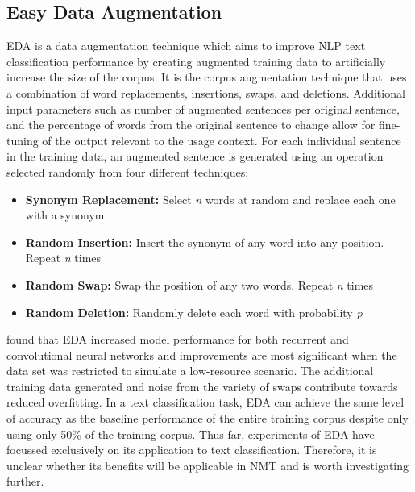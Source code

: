 





\subsection{Easy Data Augmentation}
\acrfull{EDA} is a data augmentation technique which aims to improve \acrfull{NLP} text classification performance by creating augmented training data to artificially increase the size of the corpus. It is the corpus augmentation technique that uses a combination of word replacements, insertions, swaps, and deletions. Additional input parameters such as number of augmented sentences per original sentence, and the percentage of words from the original sentence to change allow for fine-tuning of the output relevant to the usage context. For each individual sentence in the training data, an augmented sentence is generated using an operation selected randomly from four different techniques:
\begin{itemize}
    \item \textbf{Synonym Replacement:} Select \textit{n} words at random and replace each one with a synonym
    \item \textbf{Random Insertion:} Insert the synonym of any word into any position. Repeat \textit{n} times
    \item \textbf{Random Swap:} Swap the position of any two words. Repeat \textit{n} times
    \item \textbf{Random Deletion:} Randomly delete each word with probability \textit{p}
\end{itemize}

\cite{wei_eda:_2019} found that \acrshort{EDA} increased model performance for both recurrent and convolutional neural networks and improvements are most significant when the data set was restricted to simulate a low-resource scenario. The additional training data generated and noise from the variety of swaps contribute towards reduced overfitting. In a text classification task, \acrshort{EDA} can achieve the same level of accuracy as the baseline performance of the entire training corpus despite only using only 50\% of the training corpus. Thus far, experiments of \acrshort{EDA} have focussed exclusively on its application to text classification. Therefore, it is unclear whether its benefits will be applicable in \acrshort{NMT} and is worth investigating further.

